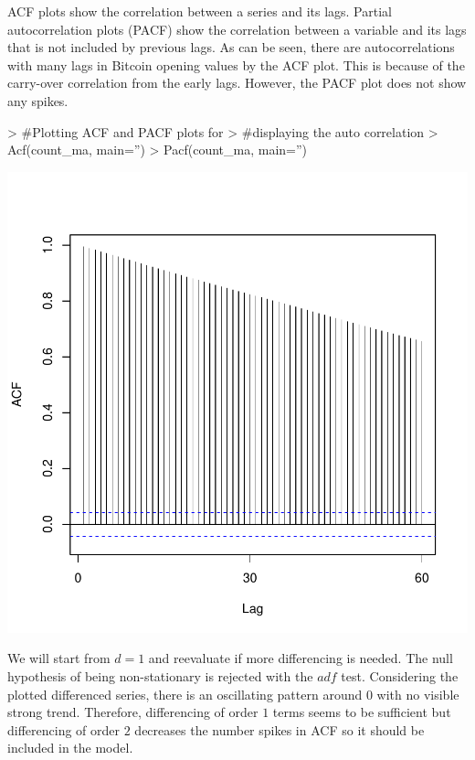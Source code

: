 \documentclass{article}
\begin{document}
ACF plots show the correlation between a series and its lags. Partial autocorrelation plots (PACF) show the correlation between a variable and its lags that is not included by previous lags. 
As can be seen, there are autocorrelations with many lags in Bitcoin opening values by the ACF plot. This is because of the carry-over correlation from the early lags. However, the PACF plot does not show any spikes.

\begin{Schunk}
\begin{Sinput}
> #Plotting ACF and PACF plots for
> #displaying the auto correlation
> Acf(count_ma, main='')
> Pacf(count_ma, main='')
\end{Sinput}
\end{Schunk}
\includegraphics{Report-017}

We will start from $d=1$ and reevaluate if more differencing is needed. The null hypothesis of being non-stationary is rejected with the $adf$ test. Considering the plotted differenced series, there is an oscillating pattern around $0$ with no visible strong trend. Therefore, differencing of order $1$ terms seems to be sufficient but differencing of order $2$ decreases the number spikes in ACF so it should be included in the model. 
\end{document}
